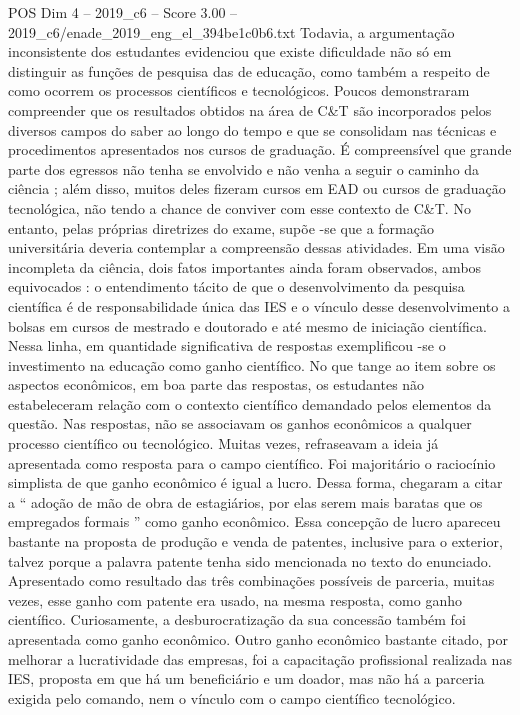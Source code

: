 \begin{textsample}{POS Dim 4 – 2019\_c6 – Score 3.00 – 2019\_c6/enade\_2019\_eng\_el\_394be1c0b6.txt}
Todavia, a argumentação inconsistente dos estudantes evidenciou que existe dificuldade não só em distinguir as funções de pesquisa das de educação, como também a respeito de como ocorrem os processos científicos e tecnológicos.
Poucos demonstraram compreender que os resultados obtidos na área de C\&T são incorporados pelos diversos campos do saber ao longo do tempo e que se consolidam nas técnicas e procedimentos apresentados nos cursos de graduação.
É compreensível que grande parte dos egressos não tenha se envolvido e não venha a seguir o caminho da ciência ; além disso, muitos deles fizeram cursos em EAD ou cursos de graduação tecnológica, não tendo a chance de conviver com esse contexto de C\&T.
No entanto, pelas próprias diretrizes do exame, supõe -se que a formação universitária deveria contemplar a compreensão dessas atividades.
Em uma visão incompleta da ciência, dois fatos importantes ainda foram observados, ambos equivocados : o entendimento tácito de que o desenvolvimento da pesquisa científica é de responsabilidade única das IES e o vínculo desse desenvolvimento a bolsas em cursos de mestrado e doutorado e até mesmo de iniciação científica.
Nessa linha, em quantidade significativa de respostas exemplificou -se o investimento na educação como ganho científico.
No que tange ao item sobre os aspectos econômicos, em boa parte das respostas, os estudantes não estabeleceram relação com o contexto científico demandado pelos elementos da questão.
Nas respostas, não se associavam os ganhos econômicos a qualquer processo científico ou tecnológico.
Muitas vezes, refraseavam a ideia já apresentada como resposta para o campo científico.
Foi majoritário o raciocínio simplista de que ganho econômico é igual a lucro.
Dessa forma, chegaram a citar a “ adoção de mão de obra de estagiários, por elas serem mais baratas que os empregados formais ” como ganho econômico.
Essa concepção de lucro apareceu bastante na proposta de produção e venda de patentes, inclusive para o exterior, talvez porque a palavra patente tenha sido mencionada no texto do enunciado.
Apresentado como resultado das três combinações possíveis de parceria, muitas vezes, esse ganho com patente era usado, na mesma resposta, como ganho científico.
Curiosamente, a desburocratização da sua concessão também foi apresentada como ganho econômico.
Outro ganho econômico bastante citado, por melhorar a lucratividade das empresas, foi a capacitação profissional realizada nas IES, proposta em que há um beneficiário e um doador, mas não há a parceria exigida pelo comando, nem o vínculo com o campo científico tecnológico.

\end{textsample}
